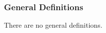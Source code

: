 \documentclass[12pt]{article}
\newcommand{\dref}[1]{GD\ref{#1}}
\newcounter{theorynum} %
\newcommand{\tref}[1]{TM\ref{#1}}
\newcommand{\aref}[1]{A\ref{#1}}
\newcommand{\deftheory}[9][Not Applicable]
{
\noindent \rule{\textwidth}{0.5mm}
\paragraph{Number: } TM\refstepcounter{theorynum}\thetheorynum
\phantomsection \label{#2}

\paragraph{Label:} #3

\noindent \rule{\textwidth}{0.5mm}

\paragraph{Equation:}

#4

\paragraph{Description:}

#5

\paragraph{Notes:}

#6

\paragraph{Source:}

#7

\paragraph{Ref.\ By:}

#8

\paragraph{Derivation for \tref{#2}:}

#9

\noindent \rule{\textwidth}{0.5mm}

}
\begin{document}

\subsubsection{General Definitions}\label{sec_gendef}



There are no general definitions.
\end{document}
